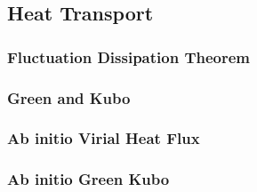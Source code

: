 \subsection{Heat Transport}
\subsubsection{Fluctuation Dissipation Theorem}
\subsubsection{Green and Kubo}
\subsubsection{Ab initio Virial Heat Flux}
\subsubsection{Ab initio Green Kubo}